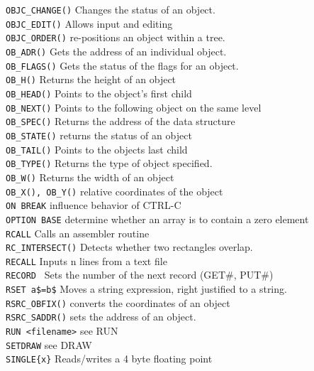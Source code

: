 \begin{tabbing}
\verb|OBJC_CHANGE()|\>        Changes the status of an object.\\
\verb|OBJC_EDIT()|\>	      Allows input and editing\\
\verb|OBJC_ORDER()|\>	      re-positions an object within a tree.\\
\verb|OB_ADR()|\>	      Gets the address of an individual object.\\
\verb|OB_FLAGS()|\>	      Gets the status of the flags for an object.\\
\verb|OB_H()|\> 	      Returns the height of an object\\
\verb|OB_HEAD()|\>	      Points to the object's first child\\
\verb|OB_NEXT()|\>	      Points to the following object on the same level\\
\verb|OB_SPEC()|\>	      Returns the address of the data structure\\
\verb|OB_STATE()|\>	      returns the status of an object\\
\verb|OB_TAIL()|\>	      Points to the objects last child\\
\verb|OB_TYPE()|\>	      Returns the type of object specified.\\
\verb|OB_W()|\> 	      Returns the width of an object\\
\verb|OB_X(), OB_Y()|\>       relative  coordinates  of  the   object\\
\verb|ON BREAK|\>	      influence behavior of CTRL-C\\
\verb|OPTION BASE|\>	      determine whether an  array  is  to contain a zero element\\
\verb|RCALL|\>        Calls  an assembler routine\\
\verb|RC_INTERSECT()|\>  Detects whether two rectangles overlap.\\
\verb|RECALL|\>       Inputs n lines from a text file\\
\verb|RECORD |\>	      Sets the number of the next record (GET\#, PUT\#)\\
\verb|RSET a$=b$|\>   Moves a string expression, right justified to a string.\\
\verb|RSRC_OBFIX()|\> converts the coordinates of an object\\
\verb|RSRC_SADDR()|\> sets the address of an object.\\
\verb|RUN <filename>|\>   see RUN\\
\verb|SETDRAW|\>      see DRAW\\
\verb|SINGLE{x}|\>    Reads/writes  a  4  byte floating point\\

\end{tabbing}
